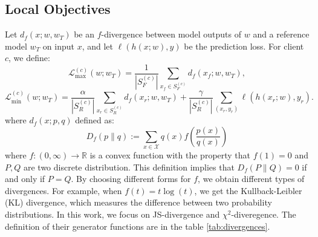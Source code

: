 \documentclass{article}
\begin{document}
\begin{figure}[h]
  \centering
  
  \caption{}
\end{figure}

\subsection{Local Objectives}

Let $d_f(x; w, w_T)$ be an $f$-divergence between model outputs of $w$ and a reference model $w_T$ on input $x$, and let $\ell(h(x; w), y)$ be the prediction loss. For client $c$, we define:
\[
\mathcal{L}_{\mathrm{max}}^{(c)}(w; w_T) = \frac{1}{|S_F^{(c)}|} \sum_{x_f \in S_F^{(c)}} d_f(x_f; w, w_T),
\]
\[
\mathcal{L}_{\mathrm{min}}^{(c)}(w; w_T) = \frac{\alpha}{|S_R^{(c)}|} \sum_{x_r \in S_R^{(c)}} d_f(x_r; w, w_T) + \frac{\gamma}{|S_R^{(c)}|} \sum_{(x_r, y_r)} \ell(h(x_r; w), y_r).
\]
where $d_f(x; p, q)$ defined as:
\[
D_f(p \parallel q) := \sum_{x \in \mathcal{X}} q(x) f\left( \frac{p(x)}{q(x)} \right)
\]
where $f: (0, \infty) \to \mathbb{R}$ is a convex function with the property that $f(1) = 0$ and $P , Q$ are two discrete distribution. This definition implies that $D_f(P \parallel Q) = 0$ if and only if $P = Q$. By choosing different forms for $f$, we obtain different types of divergences. For example, when $f(t) = t \log(t)$, we get the Kullback-Leibler (KL) divergence, which measures the difference between two probability distributions. In this work, we focus on JS-divergence and $\chi^2$-diveregence. The definition of their generator functions are in the table \ref{tab:divergences}.

\begin{table*}[t]
    \centering
    \setlength{\tabcolsep}{10pt} %
    \renewcommand{\arraystretch}{1.3} %
    \caption{Divergences and their corresponding generator functions}
    \label{tab:divergences}
\end{table*}
\end{document}
